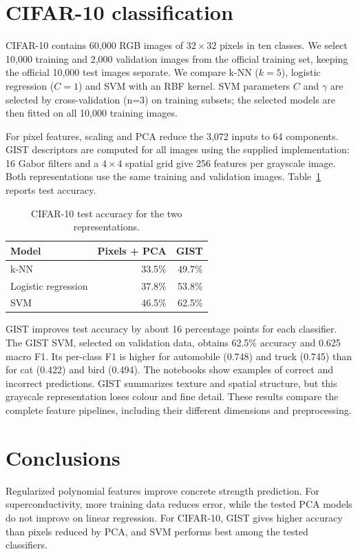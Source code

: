 \documentclass[11pt,a4paper]{article}
\begin{document}
\clearpage
\section{CIFAR-10 classification}
CIFAR-10 contains 60,000 RGB images of $32\times32$ pixels in ten classes.
We select 10,000 training and 2,000 validation images from the official training
set, keeping the official 10,000 test images separate. We compare k-NN ($k=5$),
logistic regression ($C=1$) and SVM with an RBF kernel. SVM parameters $C$ and
$\gamma$ are selected by cross-validation (n=3) on training subsets; the
selected models are then fitted on all 10,000 training images.

For pixel features, scaling and PCA reduce the 3,072 inputs to 64 components.
GIST descriptors are computed for all images using the supplied implementation:
16 Gabor filters and a $4\times4$ spatial grid give 256 features per grayscale
image. Both representations use the same training and validation
images. Table~\ref{tab:cifar} reports test accuracy.

\begin{table}[ht]
\centering
\small
\caption{CIFAR-10 test accuracy for the two representations.}
\label{tab:cifar}
\begin{tabular}{lrr}
\toprule
Model & Pixels + PCA & GIST\\
\midrule
k-NN & 33.5\% & 49.7\%\\
Logistic regression & 37.8\% & 53.8\%\\
SVM & 46.5\% & 62.5\%\\
\bottomrule
\end{tabular}
\end{table}

GIST improves test accuracy by about 16 percentage points for each classifier.
The GIST SVM, selected on validation data, obtains 62.5\% accuracy and
0.625 macro F1. Its per-class F1 is higher for automobile (0.748) and
truck (0.745) than for cat (0.422) and bird (0.494). The notebooks show examples
of correct and incorrect predictions. GIST summarizes texture and spatial
structure, but this grayscale representation loses colour and fine detail.
These results compare the complete feature pipelines, including their different
dimensions and preprocessing.

\section{Conclusions}
Regularized polynomial features improve concrete strength prediction. For
superconductivity, more training data reduces error, while the tested PCA models
do not improve on linear regression. For CIFAR-10, GIST gives higher accuracy
than pixels reduced by PCA, and SVM performs best among the tested classifiers.
\end{document}
